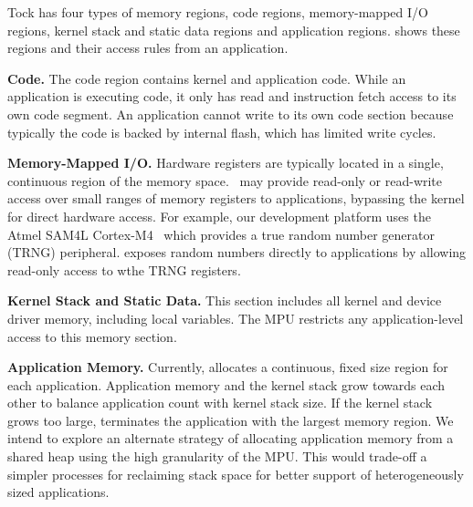 Tock has four types of memory regions, code regions, memory-mapped I/O regions,
kernel stack and static data regions and application regions.
 shows these regions and their access rules from
an application.

{\bf Code.}
The code region contains kernel and application code. While an application is
executing code, it only has read and instruction fetch access to its own code
segment. An application cannot write to its own code section because typically
the code is backed by internal flash, which has limited write cycles.

{\bf Memory-Mapped I/O.}
Hardware registers are typically located in a single, continuous region of the
memory space.~ \name may provide read-only or read-write
access over small ranges of memory registers to applications, bypassing the
kernel for direct hardware access. For example, our development platform uses
the Atmel SAM4L Cortex-M4~\cite{sam4l} which provides a true random number
generator (TRNG) peripheral. \name exposes random numbers directly to
applications by allowing read-only access to wthe TRNG registers.

{\bf Kernel Stack and Static Data.}
This section includes all kernel and device driver memory, including local
variables. The MPU restricts any application-level access to this memory section.

{\bf Application Memory.}
Currently, \name allocates a continuous, fixed size region for each
application.
Application memory and the kernel stack grow towards each other to balance
application count with kernel stack size. If the kernel stack
grows too large, \name terminates the application with the
largest memory region. We intend to explore an alternate strategy of
allocating application memory from a shared heap using the
high granularity of the MPU.
This would trade-off
a simpler processes for reclaiming stack space
for better support of heterogeneously sized applications.


